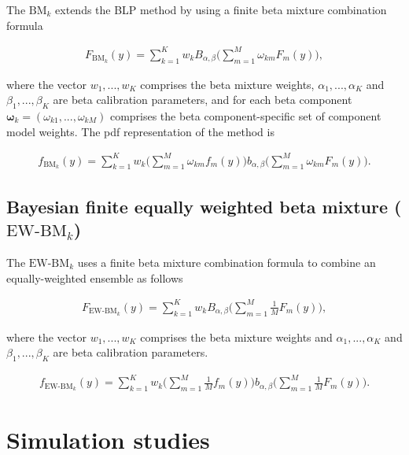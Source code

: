 \documentclass[
]{article}
\begin{document}
The \(\text{BM}_k\) extends the BLP method by using a finite beta
mixture combination formula

\begin{align}
F_{\text{BM}_k}(y)=\sum_{k=1}^K w_kB_{\alpha,\beta}\Big(\sum_{m=1}^M \omega_{km} F_m(y)\Big),
\end{align}

where the vector \(w_1,..., w_K\) comprises the beta mixture weights,
\(\alpha_1,..., \alpha_K\) and \(\beta_1,..., \beta_K\) are beta
calibration parameters, and for each beta component
\(\boldsymbol{\omega}_k=(\omega_{k1},..., \omega_{kM})\) comprises the
beta component-specific set of component model weights. The pdf
representation of the method is

\begin{align}
f_{\text{BM}_k}(y)=\sum_{k=1}^K w_k(\sum_{m=1}^M \omega_{km} f_m(y)\Big)b_{\alpha,\beta}\Big(\sum_{m=1}^M \omega_{km} F_m(y)\Big).
\end{align}

\hypertarget{bayesian-finite-equally-weighted-beta-mixture-textew-bm_k}{%
\subsection{\texorpdfstring{Bayesian finite equally weighted beta
mixture
(\(\text{EW-BM}_k\))}{Bayesian finite equally weighted beta mixture (\textbackslash text\{EW-BM\}\_k)}}\label{bayesian-finite-equally-weighted-beta-mixture-textew-bm_k}}

The \(\text{EW-BM}_k\) uses a finite beta mixture combination formula to
combine an equally-weighted ensemble as follows

\begin{align}
F_{\text{EW-BM}_k}(y)=\sum_{k=1}^K w_kB_{\alpha,\beta}\Big(\sum_{m=1}^M \frac{1}{M} F_m(y)\Big),
\end{align}

where the vector \(w_1,..., w_K\) comprises the beta mixture weights and
\(\alpha_1,..., \alpha_K\) and \(\beta_1,..., \beta_K\) are beta
calibration parameters.

\begin{align}
f_{\text{EW-BM}_k}(y)=\sum_{k=1}^K w_k(\sum_{m=1}^M \frac{1}{M} f_m(y)\Big)b_{\alpha,\beta}\Big(\sum_{m=1}^M \frac{1}{M} F_m(y)\Big).
\end{align}

\hypertarget{simulation-studies}{%
\section{Simulation studies}\label{simulation-studies}}
\end{document}
